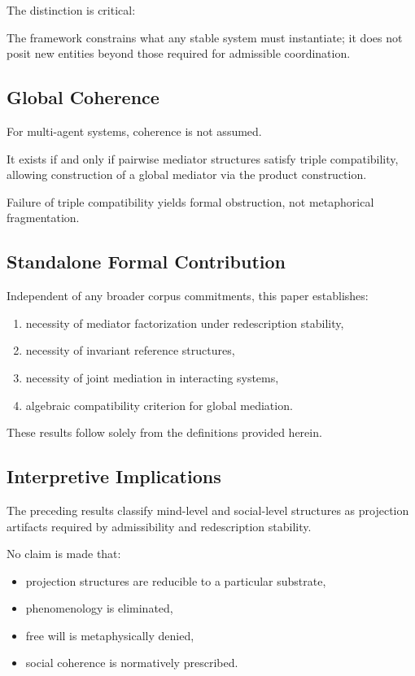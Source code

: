 \documentclass[11pt]{article}
\theoremstyle{definition}
\begin{document}
The distinction is critical:

The framework constrains what any stable system must instantiate;
it does not posit new entities beyond those required for admissible coordination.

\subsection{Global Coherence}

For multi-agent systems, coherence is not assumed.

It exists if and only if pairwise mediator structures satisfy triple compatibility,
allowing construction of a global mediator via the product construction.

Failure of triple compatibility yields formal obstruction,
not metaphorical fragmentation.

\subsection{Standalone Formal Contribution}

Independent of any broader corpus commitments, this paper establishes:

\begin{enumerate}[label=(\roman*)]
    \item necessity of mediator factorization under redescription stability,
    \item necessity of invariant reference structures,
    \item necessity of joint mediation in interacting systems,
    \item algebraic compatibility criterion for global mediation.
\end{enumerate}

These results follow solely from the definitions provided herein.


\subsection{Interpretive Implications}

The preceding results classify mind-level and social-level structures
as projection artifacts required by admissibility and redescription stability.

No claim is made that:

\begin{itemize}
    \item projection structures are reducible to a particular substrate,
    \item phenomenology is eliminated,
    \item free will is metaphysically denied,
    \item social coherence is normatively prescribed.
\end{itemize}
\end{document}
